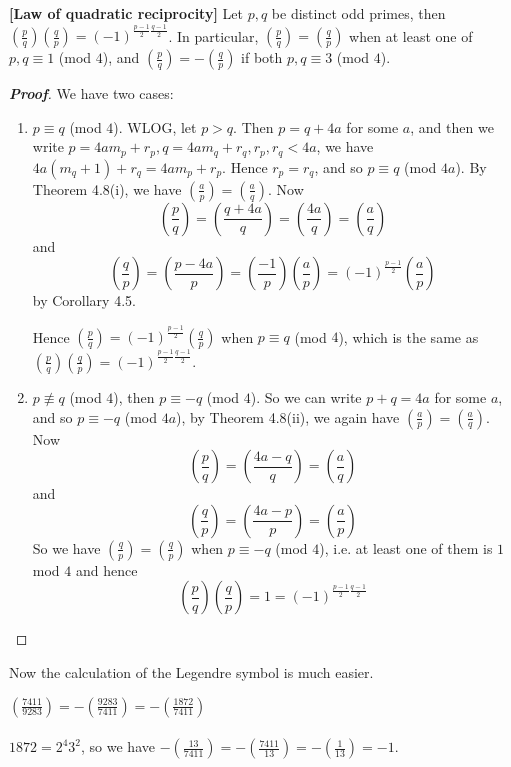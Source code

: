 \begin{theorem}{\bf [Law of quadratic reciprocity]}\label{R;Reciprocity} Let $p,q$ be distinct odd primes, then $(\frac{p}{q})(\frac{q}{p}) = (-1)^{\frac{p-1}{2} \frac{q-1}{2}}$. In particular,
$(\frac{p}{q})=(\frac{q}{p})$ when at least one of $p,q \equiv 1$ (mod $4$), and $(\frac{p}{q}) = -(\frac{q}{p})$ if both $p,q \equiv 3$ (mod $4$).
\end{theorem}
\begin{proof}[\bf Proof] We have two cases:
\begin{enumerate}
\item $p \equiv q$ (mod $4$). WLOG, let $p>q$. Then $p=q+4a$ for some $a$, and then we write $p=4am_p+r_p, q= 4am_q+r_q, r_p,r_q <4a$, we have $4a(m_q+1)+r_q=4am_p+r_p$. Hence $r_p=r_q$, and so $p \equiv q$ (mod $4a$). By Theorem 4.8(i), we have $(\frac{a}{p})=(\frac{a}{q})$.
    Now
    $$\left(\frac{p}{q}\right)=\left(\frac{q+4a}{q}\right)=\left(\frac{4a}{q}\right)
    =\left(\frac{a}{q}\right)$$
    and
    $$\left(\frac{q}{p}\right)=\left(\frac{p-4a}{p}\right)
    =\left(\frac{-1}{p}\right)\left(\frac{a}{p}\right)=(-1)^{\frac{p-1}{2}}\left(\frac{a}{p}\right)$$
    by Corollary 4.5.

    Hence $(\frac{p}{q})=(-1)^{\frac{p-1}{2}}(\frac{q}{p})$ when $p \equiv q$ (mod $4$), which is the same as $(\frac{p}{q})(\frac{q}{p})=(-1)^{\frac{p-1}{2} \frac{q-1}{2}}$.\\
\item $p \not \equiv q$ (mod $4$), then $p \equiv -q$ (mod $4$). So we can write $p+q=4a$ for some $a$, and so $p \equiv -q$ (mod $4a$), by Theorem 4.8(ii), we again have $(\frac{a}{p})=(\frac{a}{q})$.
    Now
    $$\left(\frac{p}{q}\right)=\left(\frac{4a-q}{q}\right)=\left(\frac{a}{q}\right)$$
    and
    $$\left(\frac{q}{p}\right)=\left(\frac{4a-p}{p}\right)=\left(\frac{a}{p}\right)$$
    So we have $(\frac{q}{p})=(\frac{q}{p})$ when $p \equiv -q$ (mod $4$), i.e. at least one of them is $1$ mod $4$ and hence
    $$\left(\frac{p}{q}\right)\left(\frac{q}{p}\right)=1=(-1)^{\frac{p-1}{2} \frac{q-1}{2}}$$
\end{enumerate}
\end{proof}
Now the calculation of the Legendre symbol is much easier.
\begin{example}
$(\frac{7411}{9283})=-(\frac{9283}{7411})=-(\frac{1872}{7411})$\\
~\\
$1872=2^4 3^2$, so we have $-(\frac{13}{7411})=-(\frac{7411}{13})=-(\frac{1}{13})=-1$.
\end{example}
